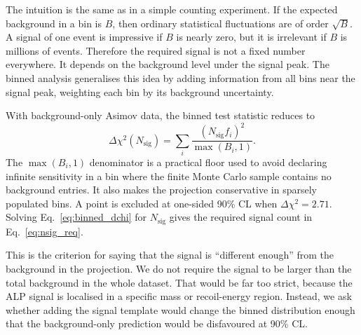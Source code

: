 \documentclass[12pt,a4paper]{article}
\newcommand{\dchi}{\Delta\chi^2}
\begin{document}
The intuition is the same as in a simple counting experiment. If the expected
background in a bin is $B$, then ordinary statistical fluctuations are of order
$\sqrt{B}$. A signal of one event is impressive if $B$ is nearly zero, but it is
irrelevant if $B$ is millions of events. Therefore the required signal is not a
fixed number everywhere. It depends on the background level under the signal
peak. The binned analysis generalises this idea by adding information from all
bins near the signal peak, weighting each bin by its background uncertainty.

With background-only Asimov data, the binned test statistic reduces to
\begin{equation}
    \dchi(N_\mathrm{sig})
    =
    \sum_i
    \frac{(N_\mathrm{sig} f_i)^2}{\max(B_i,1)}.
    \label{eq:binned_dchi}
\end{equation}
The $\max(B_i,1)$ denominator is a practical floor used to avoid declaring
infinite sensitivity in a bin where the finite Monte Carlo sample contains no
background entries. It also makes the projection conservative in sparsely
populated bins. A point is excluded at one-sided 90\% CL when
$\dchi=2.71$. Solving Eq.~\eqref{eq:binned_dchi} for $N_\mathrm{sig}$ gives the
required signal count in Eq.~\eqref{eq:nsig_req}.

This is the criterion for saying that the signal is ``different enough'' from
the background in the projection. We do not require the signal to be larger
than the total background in the whole dataset. That would be far too strict,
because the ALP signal is localised in a specific mass or recoil-energy region.
Instead, we ask whether adding the signal template would change the binned
distribution enough that the background-only prediction would be disfavoured
at 90\% CL.
\end{document}
